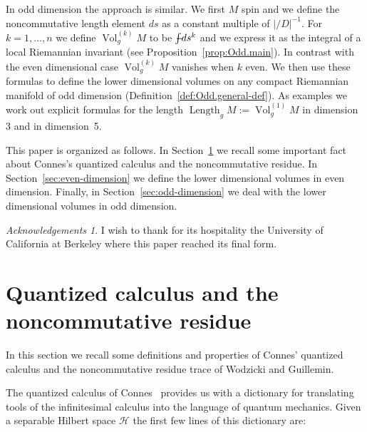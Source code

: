 \documentclass[leqno, 10pt]{amsart}
\theoremstyle{remark}
\newtheorem*{acknowledgements}{Acknowledgements}
\begin{document}
In odd dimension the approach is similar. We first $M$ spin and we define the noncommutative length element $ds$ as a constant multiple of 
$|{\ensuremath{{/\!\!\!\!D}}}|^{-1}$. For $k=1,\ldots,n$ we define ${{\operatorname{{Vol}}}}_{g}^{(k)}M$ to be ${\ensuremath{-\hspace{-2,4ex}\int}} ds^{k}$ and we express it  as the integral of a local Riemannian invariant 
(see Proposition~\ref{prop:Odd.main}). In contrast with the even dimensional case ${{\operatorname{{Vol}}}}_{g}^{(k)}M$ vanishes when $k$ even. We then use 
these formulas to define the lower dimensional volumes on any compact Riemannian manifold of odd dimension (Definition~\ref{def:Odd.general-def}). 
As examples we work out explicit formulas for the length ${\operatorname{{Length}}}_{g}M:={{\operatorname{{Vol}}}}^{(1)}_{g}M$ in dimension 3 and in dimension~5. 

This paper is organized as follows. In Section~\ref{sec:NCG} we recall some important fact about Connes's quantized calculus and the noncommutative 
residue.  In Section~\ref{sec:even-dimension} we define the lower dimensional volumes in even dimension. Finally, in Section~\ref{sec:odd-dimension}
 we deal with the lower  dimensional volumes in odd dimension.

\begin{acknowledgements}
 I wish to thank for its hospitality the University of California at Berkeley where this paper reached its final form.
\end{acknowledgements}

\section{Quantized calculus and the noncommutative residue}
\label{sec:NCG}
In this section we recall some definitions and properties of Connes' quantized calculus and the noncommutative residue trace of Wodzicki and Guillemin. 

The quantized calculus of Connes~\cite{Co:NCG} provides us with a dictionary for translating tools of 
the infinitesimal calculus into the language of quantum mechanics. Given a separable Hilbert space ${\ensuremath{\mathcal{H}}}$ the first few lines of this dictionary are: 
\end{document}
